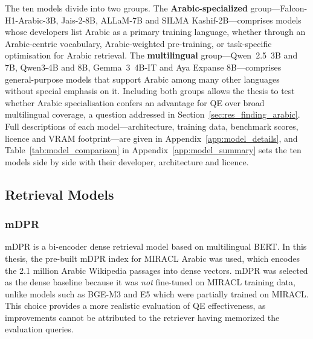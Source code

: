 The ten models divide into two groups. The \textbf{Arabic-specialized} group---Falcon-H1-Arabic-3B, Jais-2-8B, ALLaM-7B and SILMA Kashif-2B---comprises models whose developers list Arabic as a primary training language, whether through an Arabic-centric vocabulary, Arabic-weighted pre-training, or task-specific optimisation for Arabic retrieval. The \textbf{multilingual} group---Qwen~2.5~3B and 7B, Qwen3-4B and 8B, Gemma~3~4B-IT and Aya Expanse 8B---comprises general-purpose models that support Arabic among many other languages without special emphasis on it. Including both groups allows the thesis to test whether Arabic specialisation confers an advantage for QE over broad multilingual coverage, a question addressed in Section~\ref{sec:res_finding_arabic}. Full descriptions of each model---architecture, training data, benchmark scores, licence and VRAM footprint---are given in Appendix~\ref{app:model_details}, and Table~\ref{tab:model_comparison} in Appendix~\ref{app:model_summary} sets the ten models side by side with their developer, architecture and licence.

\begin{table}[H]
  \centering
  \caption[LLMs evaluated for Arabic QE]{Open-source LLMs evaluated for Arabic QE in this thesis, ordered by parameter count.}
  \label{tab:models_used}
  \footnotesize
  
\end{table}

\subsection{Retrieval Models}
\label{sec:retrieval_models}

\subsubsection{mDPR}
\label{sec:mdpr}

mDPR \cite{karpukhin_2020_dense} is a bi-encoder dense retrieval model based on multilingual BERT. In this thesis, the pre-built mDPR index for MIRACL Arabic was used, which encodes the 2.1 million Arabic Wikipedia passages into dense vectors. mDPR was selected as the dense baseline because it was \textit{not} fine-tuned on MIRACL training data, unlike models such as BGE-M3 and E5 which were partially trained on MIRACL. This choice provides a more realistic evaluation of QE effectiveness, as improvements cannot be attributed to the retriever having memorized the evaluation queries.

